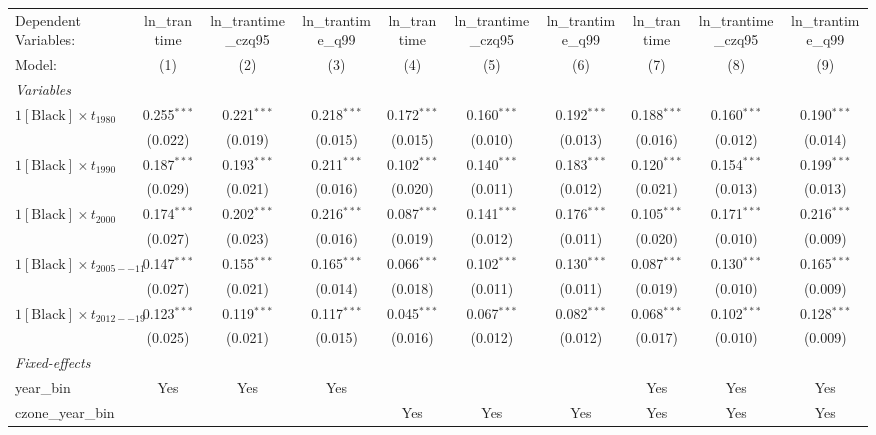 \begin{tabular}{lccccccccc}
\tabularnewline\midrule\midrule
Dependent Variables:&ln\_trantime&ln\_trantime\_czq95&ln\_trantime\_q99&ln\_trantime&ln\_trantime\_czq95&ln\_trantime\_q99&ln\_trantime&ln\_trantime\_czq95&ln\_trantime\_q99\\
Model:&(1) & (2) & (3) & (4) & (5) & (6) & (7) & (8) & (9)\\
\midrule \emph{Variables}&   &   &   &   &   &   &   &   &  \\
$1[\text{Black}] \times t_{1980}$ & 0.255$^{***}$ & 0.221$^{***}$ & 0.218$^{***}$ & 0.172$^{***}$ & 0.160$^{***}$ & 0.192$^{***}$ & 0.188$^{***}$ & 0.160$^{***}$ & 0.190$^{***}$\\
  &(0.022) & (0.019) & (0.015) & (0.015) & (0.010) & (0.013) & (0.016) & (0.012) & (0.014)\\
$1[\text{Black}] \times t_{1990}$ & 0.187$^{***}$ & 0.193$^{***}$ & 0.211$^{***}$ & 0.102$^{***}$ & 0.140$^{***}$ & 0.183$^{***}$ & 0.120$^{***}$ & 0.154$^{***}$ & 0.199$^{***}$\\
  &(0.029) & (0.021) & (0.016) & (0.020) & (0.011) & (0.012) & (0.021) & (0.013) & (0.013)\\
$1[\text{Black}] \times t_{2000}$ & 0.174$^{***}$ & 0.202$^{***}$ & 0.216$^{***}$ & 0.087$^{***}$ & 0.141$^{***}$ & 0.176$^{***}$ & 0.105$^{***}$ & 0.171$^{***}$ & 0.216$^{***}$\\
  &(0.027) & (0.023) & (0.016) & (0.019) & (0.012) & (0.011) & (0.020) & (0.010) & (0.009)\\
$1[\text{Black}] \times t_{2005--11}$ & 0.147$^{***}$ & 0.155$^{***}$ & 0.165$^{***}$ & 0.066$^{***}$ & 0.102$^{***}$ & 0.130$^{***}$ & 0.087$^{***}$ & 0.130$^{***}$ & 0.165$^{***}$\\
  &(0.027) & (0.021) & (0.014) & (0.018) & (0.011) & (0.011) & (0.019) & (0.010) & (0.009)\\
$1[\text{Black}] \times t_{2012--19}$ & 0.123$^{***}$ & 0.119$^{***}$ & 0.117$^{***}$ & 0.045$^{***}$ & 0.067$^{***}$ & 0.082$^{***}$ & 0.068$^{***}$ & 0.102$^{***}$ & 0.128$^{***}$\\
  &(0.025) & (0.021) & (0.015) & (0.016) & (0.012) & (0.012) & (0.017) & (0.010) & (0.009)\\
\midrule \emph{Fixed-effects}&   &   &   &   &   &   &   &   &  \\
year\_bin & Yes & Yes & Yes &  &  &  & Yes & Yes & Yes\\
czone\_year\_bin &  &  &  & Yes & Yes & Yes & Yes & Yes & Yes\\

\end{tabular}
